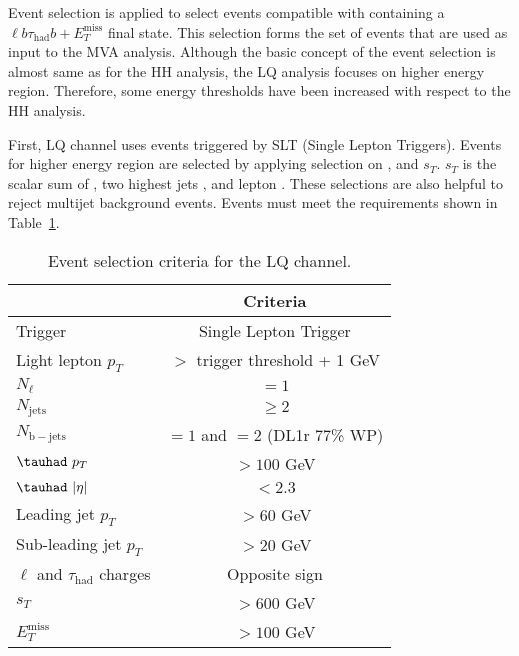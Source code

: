 Event selection is applied to select events compatible with containing a $\ell b\tau_{\mathrm{had}}b+E_{T}^{\mathrm{miss}}$ final state. 
This selection forms the set of events that are used as input to the MVA analysis.
Although the basic concept of the event selection is almost same as for the HH analysis, the LQ analysis focuses on higher energy region.
Therefore, some energy thresholds have been increased with respect to the HH analysis.

First, LQ \lephad channel uses events triggered by SLT (Single Lepton Triggers).
Events for higher energy region are selected by applying selection on \tauhad \pT, \MET and $s_T$.
$s_T$ is the scalar sum of \MET, two highest jets \pT, \tauhad \pT and lepton \pT.
These selections are also helpful to reject multijet background events.
Events must meet the requirements shown in Table~\ref{tab:lq_lephad_event_selection}.

\begin{table}[!ht]
  \centering
  \begin{tabular}{l|c} 
    \hline\hline
                                             & Criteria \\ \hline
    Trigger                                  & Single Lepton Trigger \\
    Light lepton $p_T$                       & $>$ trigger threshold + 1 GeV \\
    $N_{\ell}$                               & $=1$ \\
    $N_{\mathrm{jets}}$                      & $\geq 2$ \\
    $N_{\mathrm{b-jets}}$                    & $=1$ and $=2$ (DL1r 77\% WP)\\
    $\tauhad~p_T$                            & $>100$ GeV \\
    $\tauhad~|\eta|$                         & $<2.3$ \\
    Leading jet $p_T$                        & $>60$ GeV \\
    Sub-leading jet $p_T$                    & $>20$ GeV \\
    $\ell$ and $\tau_{\mathrm{had}}$ charges & Opposite sign\\
    $s_T$                                    & $> 600$ GeV \\
    $E_{T}^{\mathrm{miss}}$                  & $> 100$ GeV \\
    \hline\hline
  \end{tabular}
  \caption{Event selection criteria for the LQ \lephad channel.}
  \label{tab:lq_lephad_event_selection}
\end{table}

